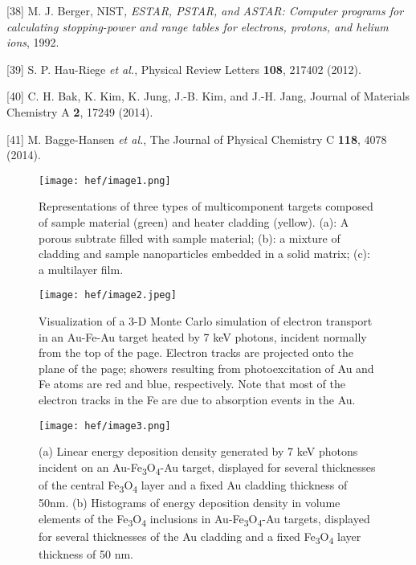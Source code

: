 {[}38{]} M. J. Berger, NIST\emph{,} \emph{ESTAR, PSTAR, and ASTAR:
Computer programs for calculating stopping-power and range tables for
electrons, protons, and helium ions}, 1992.

{[}39{]} S. P. Hau-Riege \emph{et al.}, Physical Review Letters
\textbf{108}, 217402 (2012).

{[}40{]} C. H. Bak, K. Kim, K. Jung, J.-B. Kim, and J.-H. Jang, Journal
of Materials Chemistry A \textbf{2}, 17249 (2014).

{[}41{]} M. Bagge-Hansen \emph{et al.}, The Journal of Physical
Chemistry C \textbf{118}, 4078 (2014).

\begin{figure}[h]
\caption{
Representations of three types of multicomponent
targets composed of sample material (green) and heater cladding
(yellow). (a): A porous subtrate filled with sample material; (b): a
mixture of cladding and sample nanoparticles embedded in a solid matrix;
(c): a multilayer film.
}
\label{fig:hef_image1}
\centering
\texttt{[image: hef/image1.png]}
\end{figure}

\begin{figure}[h]
\caption{
Visualization of a 3-D Monte Carlo simulation of
electron transport in an Au-Fe-Au target heated by 7 keV photons,
incident normally from the top of the page. Electron tracks are
projected onto the plane of the page; showers resulting from
photoexcitation of Au and Fe atoms are red and blue, respectively. Note
that most of the electron tracks in the Fe are due to absorption events
in the Au.
}
\label{fig:hef_image2}
\centering
\texttt{[image: hef/image2.jpeg]}
\end{figure}

\begin{figure}[h]
\caption{
(a) Linear energy deposition density generated by 7 keV
photons incident on an Au-Fe\textsubscript{3}O\textsubscript{4}-Au
target, displayed for several thicknesses of the central
Fe\textsubscript{3}O\textsubscript{4} layer and a fixed Au cladding
thickness of 50nm. (b) Histograms of energy deposition density in volume
elements of the Fe\textsubscript{3}O\textsubscript{4} inclusions in
Au-Fe\textsubscript{3}O\textsubscript{4}-Au targets, displayed for
several thicknesses of the Au cladding and a fixed
Fe\textsubscript{3}O\textsubscript{4} layer thickness of 50 nm.
}
\label{fig:hef_image3}
\centering
\texttt{[image: hef/image3.png]}
\end{figure}


